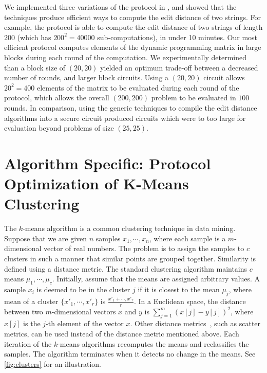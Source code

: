We implemented three variations of the protocol in \cite{kruger07},
and showed that the techniques produce efficient ways to compute the
edit distance of two strings. For example, the protocol is able to
compute the edit distance of two strings of length $200$ (which has
$200^{2}=40000$ sub-computations), in under 10 minutes. Our most
efficient protocol computes elements of the dynamic programming matrix
in large blocks during each round of the computation. We experimentally
determined than a block size of $(20,20)$ yielded an optimum trade-off
between a decreased number of rounds, and larger block circuits. Using
a $(20,20)$ circuit allows $20^{2}=400$ elements of the matrix to
be evaluated during each round of the protocol, which allows the overall
$(200,200)$ problem to be evaluated in $100$ rounds. In comparison,
using the generic techniques to compile the edit distance algorithms
into a secure circuit produced circuits which were to too large for
evaluation beyond problems of size $(25,25)$.


\section{Algorithm Specific: Protocol Optimization of K-Means Clustering}

The $k$-means algorithm is a common clustering technique in data
mining. Suppose that we are given $n$ samples $x_{1},\cdots,x_{n}$,
where each sample is a $m$-dimensional vector of real numbers. The
problem is to assign the samples to $c$ clusters in such a manner
that similar points are grouped together. Similarity is defined using
a distance metric. The standard clustering algorithm maintains $c$
means $\mu_{1},\cdots,\mu_{c}$. Initially, assume that the means
are assigned arbitrary values. A sample $x_{i}$ is deemed to be in
the cluster $j$ if it is closest to the mean $\mu_{j}$, where mean
of a cluster $\{x'_{1},\cdots,x'_{r}\}$ is $\frac{x'_{1}+\cdots,x'_{r}}{r}$.
In a Euclidean space, the distance between two $m$-dimensional vectors
$x$ and $y$ is $\sum_{j=1}^{m}(x[j]-y[j])^{2}$, where $x[j]$ is
the $j$-th element of the vector $x$. Other distance metrics~\cite[Chapter 10]{pattern-classification},
such as scatter metrics, can be used instead of the distance metric
mentioned above. Each iteration of the $k$-means algorithms recomputes
the means and reclassifies the samples. The algorithm terminates when
it detects no change in the means. See \ref{fig:clusters} for an
illustration.

